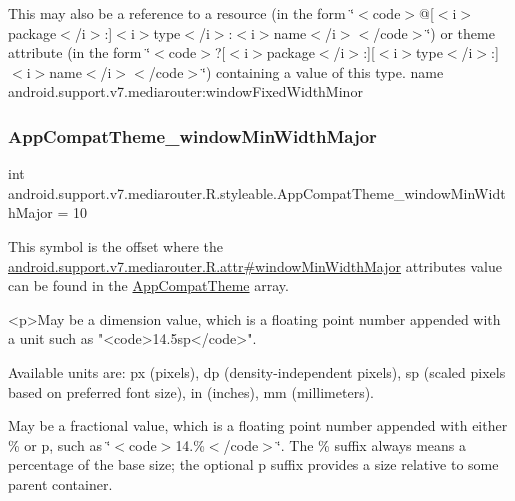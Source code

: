 This may also be a reference to a resource (in the form \char`\"{}$<$code$>$@\mbox{[}$<$i$>$package$<$/i$>$\+:\mbox{]}$<$i$>$type$<$/i$>$\+:$<$i$>$name$<$/i$>$$<$/code$>$\char`\"{}) or theme attribute (in the form \char`\"{}$<$code$>$?\mbox{[}$<$i$>$package$<$/i$>$\+:\mbox{]}\mbox{[}$<$i$>$type$<$/i$>$\+:\mbox{]}$<$i$>$name$<$/i$>$$<$/code$>$\char`\"{}) containing a value of this type.  name android.\+support.\+v7.\+mediarouter\+:window\+Fixed\+Width\+Minor \mbox{\label{classandroid_1_1support_1_1v7_1_1mediarouter_1_1R_1_1styleable_ac2a09f6509c071955e5978f37e5c4633}} 
\subsubsection{\texorpdfstring{App\+Compat\+Theme\+\_\+window\+Min\+Width\+Major}{AppCompatTheme\_windowMinWidthMajor}}
{\footnotesize\ttfamily int android.\+support.\+v7.\+mediarouter.\+R.\+styleable.\+App\+Compat\+Theme\+\_\+window\+Min\+Width\+Major = 10\hspace{0.3cm}{\ttfamily [static]}}

This symbol is the offset where the \hyperlink{classandroid_1_1support_1_1v7_1_1mediarouter_1_1R_1_1attr_a705a5811e50f04b35af963dead610055}{android.\+support.\+v7.\+mediarouter.\+R.\+attr\#window\+Min\+Width\+Major} attribute\textquotesingle{}s value can be found in the \hyperlink{classandroid_1_1support_1_1v7_1_1mediarouter_1_1R_1_1styleable_a4e3d3900c75d49aeb2f283cac00214d6}{App\+Compat\+Theme} array.

\begin{DoxyVerb}      <p>May be a dimension value, which is a floating point number appended with a unit such as "<code>14.5sp</code>".
\end{DoxyVerb}
 Available units are\+: px (pixels), dp (density-\/independent pixels), sp (scaled pixels based on preferred font size), in (inches), mm (millimeters). 

May be a fractional value, which is a floating point number appended with either \% or p, such as \char`\"{}$<$code$>$14.\%$<$/code$>$\char`\"{}. The \% suffix always means a percentage of the base size; the optional p suffix provides a size relative to some parent container. 

